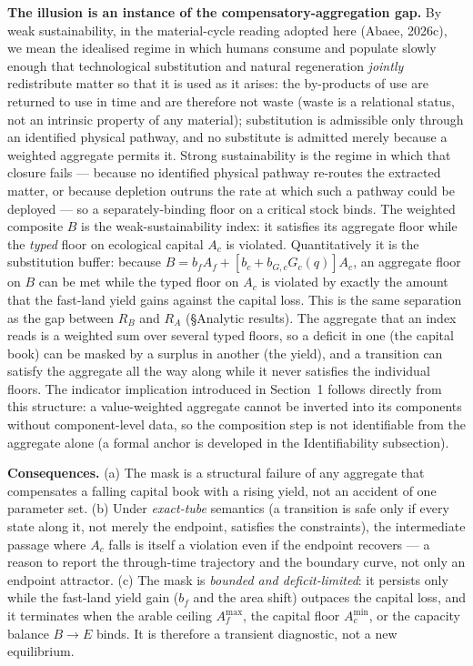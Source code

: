 \documentclass[11pt]{article}
\begin{document}
\noindent\textbf{The illusion is an instance of the compensatory-aggregation gap.} By weak sustainability, in the material-cycle reading adopted here (Abaee, 2026c), we mean the idealised regime in which humans consume and populate slowly enough that technological substitution and natural regeneration \emph{jointly} redistribute matter so that it is used as it arises: the by-products of use are returned to use in time and are therefore not waste (waste is a relational status, not an intrinsic property of any material); substitution is admissible only through an identified physical pathway, and no substitute is admitted merely because a weighted aggregate permits it. Strong sustainability is the regime in which that closure fails --- because no identified physical pathway re-routes the extracted matter, or because depletion outruns the rate at which such a pathway could be deployed --- so a separately-binding floor on a critical stock binds. The weighted composite $B$ is the weak-sustainability index: it satisfies its aggregate floor while the \emph{typed} floor on ecological capital $A_c$ is violated. Quantitatively it is the substitution buffer: because $B=b_fA_f+[b_c+b_{G,c}G_c(q)]A_c$, an aggregate floor on $B$ can be met while the typed floor on $A_c$ is violated by exactly the amount that the fast-land yield gains against the capital loss. This is the same separation as the gap between $R_B$ and $R_A$ (\S Analytic results). The aggregate that an index reads is a weighted sum over several typed floors, so a deficit in one (the capital book) can be masked by a surplus in another (the yield), and a transition can satisfy the aggregate all the way along while it never satisfies the individual floors. The indicator implication introduced in Section~1 follows directly from this structure: a value-weighted aggregate cannot be inverted into its components without component-level data, so the composition step is not identifiable from the aggregate alone (a formal anchor is developed in the Identifiability subsection).

\noindent\textbf{Consequences.} (a) The mask is a structural failure of any aggregate that compensates a falling capital book with a rising yield, not an accident of one parameter set. (b) Under \emph{exact-tube} semantics (a transition is safe only if every state along it, not merely the endpoint, satisfies the constraints), the intermediate passage where $A_c$ falls is itself a violation even if the endpoint recovers --- a reason to report the through-time trajectory and the boundary curve, not only an endpoint attractor. (c) The mask is \emph{bounded and deficit-limited}: it persists only while the fast-land yield gain ($b_f$ and the area shift) outpaces the capital loss, and it terminates when the arable ceiling $A_f^{\max}$, the capital floor $A_c^{\min}$, or the capacity balance $B\to E$ binds. It is therefore a transient diagnostic, not a new equilibrium.
\end{document}
